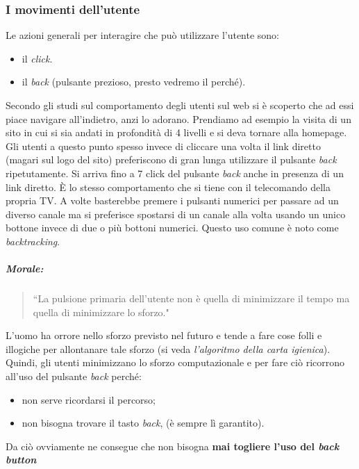		\subsubsection{I movimenti dell'utente}
			Le azioni generali per interagire che può utilizzare l'utente sono:
			\begin{itemize}
				\item il \emph{click}.
				\item il \emph{back} (pulsante prezioso, presto vedremo il perché).
			\end{itemize}
			Secondo gli studi sul comportamento degli utenti sul web si è scoperto che ad essi piace navigare all'indietro, anzi lo adorano. Prendiamo ad esempio la visita di un sito in cui si sia andati in profondità di 4 livelli e si deva tornare alla homepage. Gli utenti a questo punto spesso invece di cliccare una volta  il link diretto (magari sul logo del sito) preferiscono di gran lunga utilizzare il pulsante \emph{back} ripetutamente.
			Si arriva fino a 7 click del pulsante \emph{back} anche in presenza di un link diretto. È lo stesso comportamento che si tiene con il telecomando della propria TV. A volte basterebbe premere i pulsanti numerici per passare ad un diverso canale ma si preferisce spostarsi di un canale alla volta usando un unico bottone invece di due o più bottoni numerici. Questo uso comune è noto come \emph{backtracking}.
			\subparagraph*{Morale:}
			\begin{quote}
				``La pulsione primaria dell'utente non è quella di minimizzare il tempo ma quella di minimizzare lo sforzo."
			\end{quote}
			L'uomo ha orrore nello sforzo previsto nel futuro e tende a fare cose folli e illogiche per allontanare tale sforzo (si veda \emph{l'algoritmo della carta igienica}). Quindi, gli utenti minimizzano lo sforzo computazionale e per fare ciò ricorrono all'uso del pulsante \emph{back} perché:
			\begin{itemize}
				\item non serve ricordarsi il percorso;
				\item non bisogna trovare il tasto \emph{back}, (è sempre lì garantito).
			\end{itemize}
			Da ciò ovviamente ne consegue che non bisogna \textbf{mai togliere l'uso del \emph{back button}}
			
